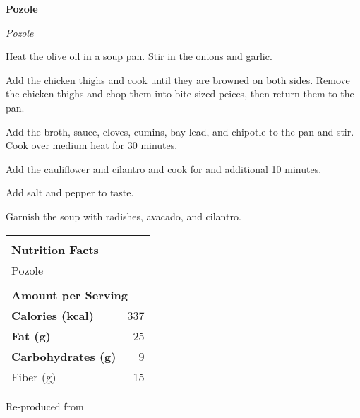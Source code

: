 \documentclass[../recipe-collections/cooking.tex]{subfiles}
\begin{document}
\begin{recipe}{\textbf{Pozole}}{}{}

  \freeform{}\textit{Pozole}


  Heat the olive oil in a soup pan. Stir in the onions and garlic.


  Add the chicken thighs and cook until they are browned on both sides. Remove the 
  chicken thighs and chop them into bite sized peices, then return them to the pan.


  Add the broth, sauce, cloves, cumins, bay lead, and chipotle to the pan and stir.
  Cook over medium heat for 30 minutes. 


  Add the cauliflower and cilantro and cook for and additional 10 minutes. 


  Add salt and pepper to taste.


  Garnish the soup with radishes, avacado, and cilantro.

  \bigskip
  \centering
  \begin{tabular}{|lr|}
    \hline
                                        &                                       \\
    \multicolumn{2}{|l|}{\huge{\textbf{\textrm{Nutrition Facts}}}}              \\
    \multicolumn{2}{|l|}{\textrm{Pozole}}                               \\ 
                                        &                                       \\
    \multicolumn{2}{|l|}{\footnotesize{\textbf{\textrm{Amount per Serving}}}}   \\ \hline
    \textbf{\textrm{Calories (kcal)}}   & \textrm{337}                          \\ \hline
    \textbf{\textrm{Fat (g)}}           & \textrm{25}                           \\ \hline
    \textbf{\textrm{Carbohydrates (g)}} & \textrm{9}                            \\ \hline
    \hspace{2mm} \textrm{Fiber (g)}     & \textrm{15}                            \\ \hline
  \end{tabular}

  \freeform{}\hrulefill{}
  

\end{recipe}

Re-produced from  \autocite{mccolgan_2021}
\end{document}
